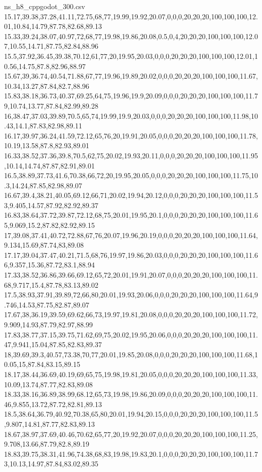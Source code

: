 \begin{filecontents*}[overwrite]{ns_h8_cppgodot_300.csv}
15.17,39.38,37.28,41.11,72.75,68,77,19.99,19.92,20.07,0,0,0,20,20,20,100,100,100,12.01,10.84,14.79,87.78,82.68,89.13
15.33,39.24,38.07,40.97,72,68,77,19.98,19.86,20.08,0.5,0,4,20,20,20,100,100,100,12.07,10.55,14.71,87.75,82.84,88.96
15.5,37.92,36.45,39.38,70.12,61,77,20,19.95,20.03,0,0,0,20,20,20,100,100,100,12.01,10.56,14.75,87.8,82.96,88.97
15.67,39,36.74,40.54,71.88,67,77,19.96,19.89,20.02,0,0,0,20,20,20,100,100,100,11.67,10.34,13.27,87.84,82.7,88.96
15.83,38.18,36.73,40.37,69.25,64,75,19.96,19.9,20.09,0,0,0,20,20,20,100,100,100,11.79,10.74,13.77,87.84,82.99,89.28
16,38.47,37.03,39.89,70.5,65,74,19.99,19.9,20.03,0,0,0,20,20,20,100,100,100,11.98,10.43,14.1,87.83,82.98,89.11
16.17,39.97,36.24,41.59,72.12,65,76,20,19.91,20.05,0,0,0,20,20,20,100,100,100,11.78,10.19,13.58,87.8,82.93,89.01
16.33,38.52,37.36,39.8,70.5,62,75,20.02,19.93,20.11,0,0,0,20,20,20,100,100,100,11.95,10.14,14.74,87.87,82.91,89.01
16.5,38.89,37.73,41.6,70.38,66,72,20,19.95,20.05,0,0,0,20,20,20,100,100,100,11.75,10.3,14.24,87.85,82.98,89.07
16.67,39.4,38.21,40.05,69.12,66,71,20.02,19.94,20.12,0,0,0,20,20,20,100,100,100,11.53,9.405,14.57,87.92,82.92,89.37
16.83,38.64,37.72,39.87,72.12,68,75,20.01,19.95,20.1,0,0,0,20,20,20,100,100,100,11.65,9.069,15.2,87.82,82.92,89.15
17,39.08,37.41,40.72,72.88,67,76,20.07,19.96,20.19,0,0,0,20,20,20,100,100,100,11.64,9.134,15.69,87.74,83,89.08
17.17,39.04,37.47,40.21,71.5,68,76,19.97,19.86,20.03,0,0,0,20,20,20,100,100,100,11.66,9.357,15.36,87.72,83.1,88.94
17.33,38.52,36.86,39.66,69.12,65,72,20.01,19.91,20.07,0,0,0,20,20,20,100,100,100,11.68,9.717,15.4,87.78,83.13,89.02
17.5,38.93,37.91,39.89,72,66,80,20.01,19.93,20.06,0,0,0,20,20,20,100,100,100,11.64,9.746,14.53,87.75,82.87,89.07
17.67,38,36.19,39.59,69.62,66,73,19.97,19.81,20.08,0,0,0,20,20,20,100,100,100,11.72,9.909,14.93,87.79,82.97,88.99
17.83,38.77,37.15,39.75,71.62,69,75,20.02,19.95,20.06,0,0,0,20,20,20,100,100,100,11.47,9.941,15.04,87.85,82.83,89.37
18,39.69,39.3,40.57,73.38,70,77,20.01,19.85,20.08,0,0,0,20,20,20,100,100,100,11.68,10.05,15,87.84,83.15,89.15
18.17,38.44,36.69,40.19,69,65,75,19.98,19.81,20.05,0,0,0,20,20,20,100,100,100,11.33,10.09,13.74,87.77,82.83,89.08
18.33,38.16,36.89,38.99,68.12,65,73,19.98,19.86,20.09,0,0,0,20,20,20,100,100,100,11.46,9.855,13.72,87.72,82.81,89.13
18.5,38.64,36.79,40.92,70.38,65,80,20.01,19.94,20.15,0,0,0,20,20,20,100,100,100,11.5,9.807,14.81,87.77,82.83,89.13
18.67,38.97,37.69,40.46,70.62,65,77,20,19.92,20.07,0,0,0,20,20,20,100,100,100,11.25,9.708,13.66,87.79,82.8,89.19
18.83,39.75,38.31,41.96,74.38,68,83,19.98,19.83,20.1,0,0,0,20,20,20,100,100,100,11.73,10.13,14.97,87.84,83.02,89.35

\end{filecontents*}
